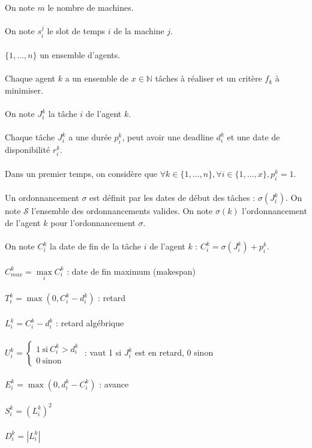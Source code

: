 \documentclass[12pt]{article}
\theoremstyle{definition}
\begin{document}
\noindent
On note $m$ le nombre de machines.\\\\
On note $s_i^j$ le slot de temps $i$ de la machine $j$.\\\\
$\lbrace 1,\dots , n \rbrace$ un ensemble d'agents.\\\\
Chaque agent $k$ a un ensemble de $x \in \mathbb{N}$ tâches à réaliser et un critère $f_k$ à minimiser.\\\\
On note $J_i^k$ la tâche $i$ de l'agent $k$.\\\\
Chaque tâche $J_i^k$ a une durée $p_i^k$, peut avoir une deadline $d_i^k$ et une date de disponibilité $r_i^k$.\\\\
Dans un premier temps, on considère que $\forall k \in \lbrace 1, \dots , n \rbrace, \forall i \in \lbrace 1, \dots , x \rbrace, p_i^k = 1$.\\\\
Un ordonnancement $\sigma$ est définit par les dates de début des tâches : $\sigma(J_i^k)$. On note $\mathscr{S}$ l'ensemble des ordonnancements valides. On note $\sigma(k)$ l'ordonnancement de l'agent $k$ pour l'ordonnancement $\sigma$.\\\\
On note $C_i^k$ la date de fin de la tâche $i$ de l'agent $k$ : $C_i^k = \sigma(J_i^k) + p_i^k$.\\\\
$C_{max}^k = \max\limits_i C_i^k$ : date de fin maximum (makespan)\\\\
$T_i^k = \max(0, C_i^k - d_i^k)$ : retard\\\\
$L_i^k = C_i^k - d_i^k$ : retard algébrique\\\\
$U_i^k = \left\{
\begin{array}{l}
  1 \ \mathrm{si} \ C_i^k>d_i^k \\
  0 \ \mathrm{sinon}
\end{array}
\right.$ : vaut 1 si $J_i^k$ est en retard, 0 sinon\\\\
$E_i^k = \max (0, d_i^k - C_i^k)$ : avance\\\\
$S_i^k = (L_i^k)^2$\\\\
$D_i^k = |L_i^k|$
\end{document}
